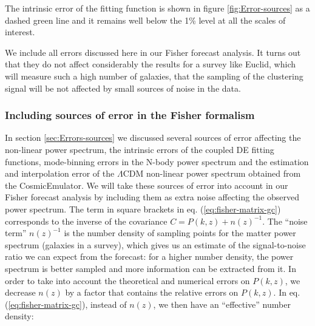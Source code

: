 The intrinsic error of the fitting function is shown in figure \ref{fig:Error-sources}
as a dashed green line and it remains well below the 1\% level at
all the scales of interest.

We include all errors discussed here in our Fisher forecast analysis.
It turns out that they do not affect considerably the results for
a survey like Euclid, which will measure such a high number of galaxies,
that the sampling of the clustering signal will be not affected by
small sources of noise in the data.







\subsubsection{Including sources of error in the Fisher formalism\label{sub:Including-sources-of}}

In section \ref{sec:Errors-sources} we discussed several sources
of error affecting the non-linear power spectrum, the intrinsic errors
of the coupled DE fitting functions, mode-binning errors in the N-body
power spectrum and the estimation and interpolation error of the $\Lambda\mbox{CDM}$
non-linear power spectrum obtained from the CosmicEmulator. We will
take these sources of error into account in our Fisher forecast analysis
by including them as extra noise affecting the observed power spectrum.
The term in square brackets in eq. (\ref{eq:fisher-matrix-gc}) corresponds
to the inverse of the covariance $C=P(k,z)+n(z)^{-1}$. The ``noise
term'' $n(z)^{-1}$ is the number density of sampling points for
the matter power spectrum (galaxies in a survey), which gives us an
estimate of the signal-to-noise ratio we can expect from the forecast:
for a higher number density, the power spectrum is better sampled
and more information can be extracted from it. In order to take into
account the theoretical and numerical errors on $P(k,z)$, we decrease
$n(z)$ by a factor that contains the relative errors on $P(k,z)$.
In eq. (\ref{eq:fisher-matrix-gc}), instead of $n(z)$, we then have
an ``effective'' number density:

